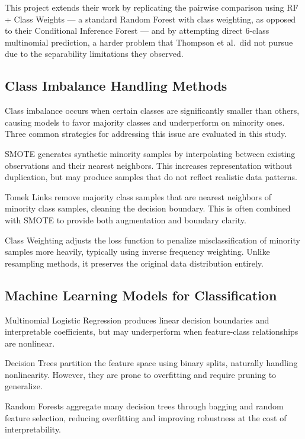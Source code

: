 \documentclass[12pt, a4paper]{article}
\begin{document}
This project extends their work by replicating the pairwise comparison using RF +
Class Weights --- a standard Random Forest with class weighting, as opposed to their
Conditional Inference Forest --- and by attempting direct 6-class multinomial prediction,
a harder problem that Thompson et al.\ did not pursue due to the separability limitations
they observed.

\subsection{Class Imbalance Handling Methods}

Class imbalance occurs when certain classes are significantly smaller than others,
causing models to favor majority classes and underperform on minority ones. Three
common strategies for addressing this issue are evaluated in this study.

SMOTE generates synthetic minority samples by interpolating between existing
observations and their nearest neighbors. This increases representation without
duplication, but may produce samples that do not reflect realistic data patterns.

Tomek Links remove majority class samples that are nearest neighbors of minority
class samples, cleaning the decision boundary. This is often combined with SMOTE
to provide both augmentation and boundary clarity.

Class Weighting adjusts the loss function to penalize misclassification of minority
samples more heavily, typically using inverse frequency weighting. Unlike resampling
methods, it preserves the original data distribution entirely.

\subsection{Machine Learning Models for Classification}

Multinomial Logistic Regression produces linear decision boundaries and interpretable
coefficients, but may underperform when feature-class relationships are nonlinear.

Decision Trees partition the feature space using binary splits, naturally handling
nonlinearity. However, they are prone to overfitting and require pruning to generalize.

Random Forests aggregate many decision trees through bagging and random feature
selection, reducing overfitting and improving robustness at the cost of interpretability.
\end{document}
